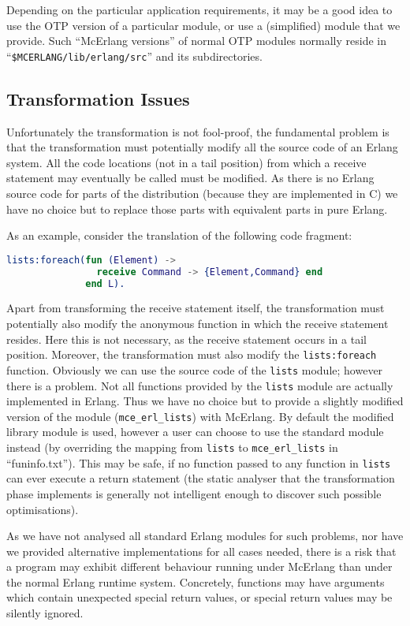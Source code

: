 \documentclass[a4paper]{article}
\begin{document}
Depending on the particular application requirements, it may be a good
idea to use the OTP version of a particular module, or use a (simplified)
module that we provide. Such ``McErlang versions'' of normal OTP modules
normally reside in ``\texttt{\$MCERLANG/lib/erlang/src}'' and its
subdirectories.

\subsection{Transformation Issues}
\label{issues}

Unfortunately the transformation is not fool-proof,
the fundamental problem is that the transformation must potentially
modify all the source code of an Erlang system. 
All the code locations (not in a tail position)
from which a receive statement may eventually
be called must be modified. As there is no Erlang source code for parts of 
the distribution (because they are implemented in C) we have no choice
but to replace those parts with equivalent parts in pure Erlang.

As an example, consider the translation of the following
code fragment:
\begin{lstlisting}[language=Erlang]
lists:foreach(fun (Element) -> 
                receive Command -> {Element,Command} end 
              end L).
\end{lstlisting}
Apart from transforming the receive statement itself,
the transformation must potentially also modify the anonymous function in which
the receive statement resides. Here this is not necessary, as the
receive statement occurs in a tail position.
Moreover, the transformation must also modify the \lstinline{lists:foreach}
function. Obviously we can use the source code of the \lstinline{lists} module;
however there is a problem. Not all functions provided by the
\lstinline{lists} module are actually implemented in Erlang. Thus we have
no choice but to provide a slightly modified version of the module
(\lstinline{mce_erl_lists})
with McErlang. By default the modified library module is used, however a user
can choose to use the standard module instead (by overriding the mapping
from \lstinline{lists} to \lstinline{mce_erl_lists} in ``funinfo.txt'').
This may be safe, if no function passed to any function in \lstinline{lists}
can ever execute a return statement (the static analyser that the
transformation phase implements is generally not intelligent enough
to discover such possible optimisations).

As we have not analysed all standard Erlang modules for such problems,
nor have we provided alternative implementations for all cases
needed, there is a risk that a program may exhibit different behaviour
running under McErlang than under the normal Erlang runtime system.
Concretely, functions may have arguments which contain unexpected
special return values, or special return values may be silently ignored.
\end{document}
